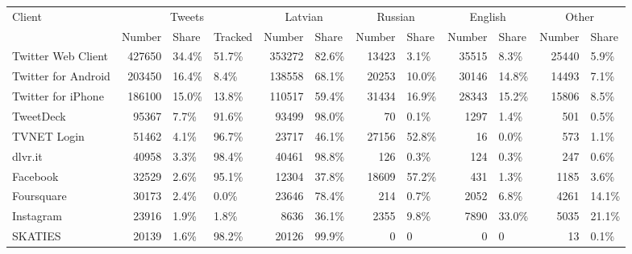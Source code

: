 \begin{tabular}{lrllrlrlrlrl}
\toprule
\multirow{2}{*}{Client} & \multicolumn{3}{c}{Tweets} & \multicolumn{2}{c}{Latvian} & \multicolumn{2}{c}{Russian} & \multicolumn{2}{c}{English} & \multicolumn{2}{c}{Other} \\
\cmidrule(r){2-4} \cmidrule(r){5-6} \cmidrule(r){7-8} \cmidrule(r){9-10} \cmidrule(r){11-12}
{} &  Number & Share & Tracked & Number & Share & Number & Share & Number & Share & Number & Share \\
\midrule
Twitter Web Client  &      427650 &       34.4\% &                51.7\% &            353272 &             82.6\% &             13423 &              3.1\% &             35515 &              8.3\% &            25440 &             5.9\% \\
Twitter for Android &      203450 &       16.4\% &                 8.4\% &            138558 &             68.1\% &             20253 &             10.0\% &             30146 &             14.8\% &            14493 &             7.1\% \\
Twitter for iPhone  &      186100 &       15.0\% &                13.8\% &            110517 &             59.4\% &             31434 &             16.9\% &             28343 &             15.2\% &            15806 &             8.5\% \\
TweetDeck           &       95367 &        7.7\% &                91.6\% &             93499 &             98.0\% &                70 &              0.1\% &              1297 &              1.4\% &              501 &             0.5\% \\
TVNET Login         &       51462 &        4.1\% &                96.7\% &             23717 &             46.1\% &             27156 &             52.8\% &                16 &              0.0\% &              573 &             1.1\% \\
dlvr.it             &       40958 &        3.3\% &                98.4\% &             40461 &             98.8\% &               126 &              0.3\% &               124 &              0.3\% &              247 &             0.6\% \\
Facebook            &       32529 &        2.6\% &                95.1\% &             12304 &             37.8\% &             18609 &             57.2\% &               431 &              1.3\% &             1185 &             3.6\% \\
Foursquare          &       30173 &        2.4\% &                 0.0\% &             23646 &             78.4\% &               214 &              0.7\% &              2052 &              6.8\% &             4261 &            14.1\% \\
Instagram           &       23916 &        1.9\% &                 1.8\% &              8636 &             36.1\% &              2355 &              9.8\% &              7890 &             33.0\% &             5035 &            21.1\% \\
SKATIES             &       20139 &        1.6\% &                98.2\% &             20126 &             99.9\% &                 0 &                 0 &                 0 &                 0 &               13 &             0.1\% \\
\bottomrule
\end{tabular}

